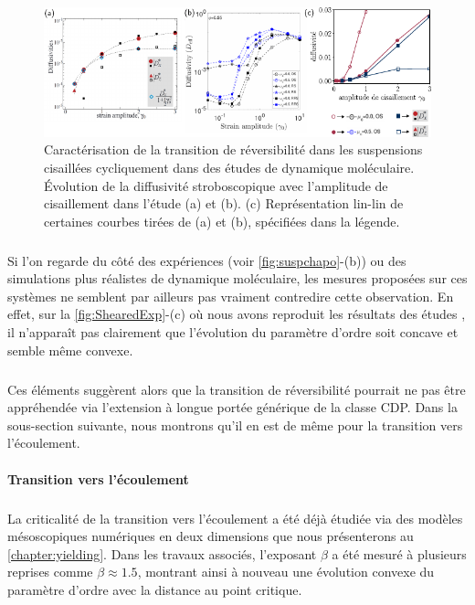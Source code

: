 \begin{figure}[h]
	\centering
	\includegraphics[width=\textwidth]{Chapitre1/Figures/LongRange/ExpShear.pdf}
	\caption{Caractérisation de la transition de réversibilité dans les suspensions cisaillées cycliquement dans des études de dynamique moléculaire. Évolution de la diffusivité stroboscopique avec l'amplitude de cisaillement dans l'étude \cite{metzger_irreversibility_2010} (a) et \cite{agrawal_dense_2024} (b). (c) Représentation lin-lin de certaines courbes tirées de (a) et (b), spécifiées dans la légende.}
	\label{fig:ShearedExp}
\end{figure}

\subparagraph{}Si l'on regarde du côté des expériences (voir \autoref{fig:suspchapo}-(b)) ou des simulations plus réalistes de dynamique moléculaire, les mesures proposées sur ces systèmes ne semblent par ailleurs pas vraiment contredire cette observation. En effet, sur la \autoref{fig:ShearedExp}-(c) où nous avons reproduit les résultats des études \cite{metzger_irreversibility_2010, agrawal_dense_2024}, il n'apparaît pas clairement que l'évolution du paramètre d'ordre soit concave et semble même convexe. 

\subparagraph{}Ces éléments suggèrent alors que la transition de réversibilité pourrait ne pas être appréhendée via l'extension à longue portée générique de la classe CDP. Dans la sous-section suivante, nous montrons qu'il en est de même pour la transition vers l'écoulement.

\paragraph{Transition vers l'écoulement}

\subparagraph{}La criticalité de la transition vers l'écoulement a été déjà étudiée via des modèles mésoscopiques numériques en deux dimensions que nous présenterons au \autoref{chapter:yielding}\cite{lin_scaling_2014, liu_driving_2016, ferrero_criticality_2019, picard_slow_2005}. Dans les travaux associés, l'exposant $\beta$ a été mesuré à plusieurs reprises comme $\beta\approx 1.5$, montrant ainsi à nouveau une évolution convexe du paramètre d'ordre avec la distance au point critique.

